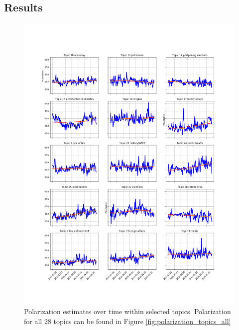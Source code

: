 \documentclass{article}
\begin{document}
	\subsection*{Results}
	
	\begin{figure}[!h]
	
		\includegraphics[width=\columnwidth]{figures/polarization_topics.png}
		\caption{Polarization estimates over time within selected topics. Polarization for all 28 topics can be found in Figure \ref{fig:polarization_topics_all}}
		\label{fig:partisanship_topics}
	
	\end{figure}
\end{document}
